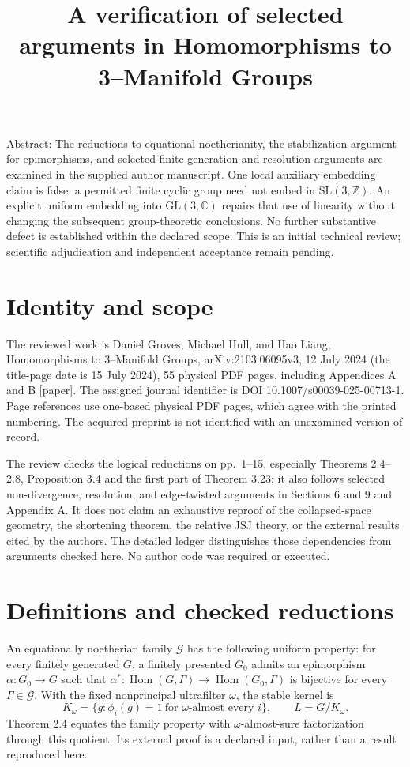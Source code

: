 \documentclass[10pt]{article}
\title{A verification of selected arguments in
Homomorphisms to 3–Manifold Groups}
\author{}
\date{}
\begin{document}
\maketitle
Abstract: The reductions to equational noetherianity, the stabilization argument for epimorphisms, and selected finite-generation and resolution arguments are examined in the supplied author manuscript. One local auxiliary embedding claim is false: a permitted finite cyclic group need not embed in \(\mathrm{SL}(3,\mathbb Z)\). An explicit uniform embedding into \(\mathrm{GL}(3,\mathbb C)\) repairs that use of linearity without changing the subsequent group-theoretic conclusions. No further substantive defect is established within the declared scope. This is an initial technical review; scientific adjudication and independent acceptance remain pending.\par
\section*{Identity and scope}
The reviewed work is Daniel Groves, Michael Hull, and Hao Liang, Homomorphisms to 3–Manifold Groups, arXiv:2103.06095v3, 12 July 2024 (the title-page date is 15 July 2024), 55 physical PDF pages, including Appendices A and B [paper]. The assigned journal identifier is DOI 10.1007/s00039-025-00713-1. Page references use one-based physical PDF pages, which agree with the printed numbering. The acquired preprint is not identified with an unexamined version of record.\par
The review checks the logical reductions on pp. 1–15, especially Theorems 2.4–2.8, Proposition 3.4 and the first part of Theorem 3.23; it also follows selected non-divergence, resolution, and edge-twisted arguments in Sections 6 and 9 and Appendix A. It does not claim an exhaustive reproof of the collapsed-space geometry, the shortening theorem, the relative JSJ theory, or the external results cited by the authors. The detailed ledger distinguishes those dependencies from arguments checked here. No author code was required or executed.\par
\section*{Definitions and checked reductions}
An equationally noetherian family \(\mathcal G\) has the following uniform property: for every finitely generated \(G\), a finitely presented \(G_0\) admits an epimorphism \(\alpha:G_0\to G\) such that \(\alpha^*:\operatorname{Hom}(G,\Gamma)\to
\operatorname{Hom}(G_0,\Gamma)\) is bijective for every \(\Gamma\in\mathcal G\). With the fixed nonprincipal ultrafilter \(\omega\), the stable kernel is \[K_\omega=\{g:\phi_i(g)=1\ \text{for $\omega$-almost every }i\},
 \qquad L=G/K_\omega .\] Theorem 2.4 equates the family property with \(\omega\)-almost-sure factorization through this quotient. Its external proof is a declared input, rather than a result reproduced here.\par
\end{document}
